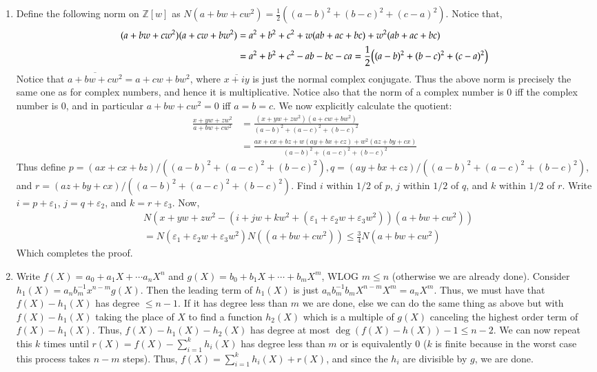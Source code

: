 \documentclass[12pt]{article}
\theoremstyle{definitionstyle}
\def\mbb#1{\mathbb{#1}}
\def \ve{\varepsilon}
\newcommand{\Z}{\mbb Z}
\begin{document}
\begin{enumerate}[leftmargin=\labelsep]
		\item Define the following norm on $\Z[w]$ as $N(a+bw+cw^2) = \frac12((a-b)^2 + (b-c)^2 + (c-a)^2)$. Notice that,
		\begin{align*}
			(a+bw+cw^2)(a+cw+bw^2) &= a^2 + b^2 + c^2 + w(ab + ac + bc) + w^2(ab + ac + bc) 
			\\ &= a^2 + b^2 + c^2 - ab - bc - ca = \frac12\qty((a-b)^2 + (b-c)^2 + (c-a)^2)
		\end{align*}
		Notice that $\overline{a+bw+cw^2} = a+cw+bw^2$, where $\overline{x+iy}$ is just the normal complex conjugate. Thus the above norm is precisely the same one as for complex numbers, and hence it is multiplicative. Notice also that the norm of a complex number is 0 iff the complex number is 0, and in particular $a+bw+cw^2 = 0$ iff $a = b = c$. We now explicitly calculate the quotient: 
		\begin{align*}
			\frac{x+yw+zw^2}{a+bw+cw^2} &= \frac{(x+yw+zw^2)(a+cw+bw^2)}{(a-b)^2+(a-c)^2+(b-c)^2} 
			\\& = \frac{ax+cx+bz+w(ay+bx+cz) + w^2(az+by+cx)}{(a-b)^2+(a-c)^2+(b-c)^2}
		\end{align*}
		Thus define $p = (ax+cx+bz)/((a-b)^2+(a-c)^2+(b-c)^2), q = (ay+bx+cz)/((a-b)^2+(a-c)^2+(b-c)^2)$, and $r = (az+by+cx)/((a-b)^2+(a-c)^2+(b-c)^2)$. Find $i$ within $1/2$ of $p$, $j$ within $1/2$ of $q$, and $k$ within $1/2$ of $r$. Write $i = p + \ve_1$, $j = q + \ve_2$, and $k = r + \ve_3$. Now,
		\begin{align*}
			&N(x+yw+zw^2 - (i + jw + kw^2 + (\ve_1 + \ve_2w + \ve_3w^2))(a+bw+cw^2)) \\
			&= N(\ve_1 + \ve_2w + \ve_3w^2)N((a+bw+cw^2)) \leq \frac{3}{4}N(a+bw+cw^2)
		\end{align*}
		Which completes the proof.
		
		\item Write $f(X) = a_0 + a_1X + \cdots a_nX^n$ and $g(X) = b_0 + b_1X + \cdots + b_mX^m$, WLOG $m \leq n$ (otherwise we are already done). Consider $h_1(X) = a_nb_m^{-1}x^{n-m}g(X)$. Then the leading term of $h_1(X)$ is just $a_nb_m^{-1}b_mX^{n-m}X^m = a_nX^m$. Thus, we must have that $f(X) - h_1(X)$ has degree $\leq n-1$. If it has degree less than $m$ we are done, else we can do the same thing as above but with $f(X) - h_1(X)$ taking the place of $X$ to find a function $h_2(X)$ which is a multiple of $g(X)$ canceling the highest order term of $f(X)-h_1(X)$. Thus, $f(X)-h_1(X)-h_2(X)$ has degree at most $\deg(f(X)-h(X)) - 1 \leq n-2$. We can now repeat this $k$ times until $r(X) = f(X) - \sum_{i=1}^k h_i(X)$ has degree less than $m$ or is equivalently 0 ($k$ is finite because in the worst case this process takes $n-m$ steps). Thus, $f(X) = \sum_{i=1}^k h_i(X) + r(X)$, and since the $h_i$ are divisible by $g$, we are done.
		

\end{enumerate}
\end{document}
